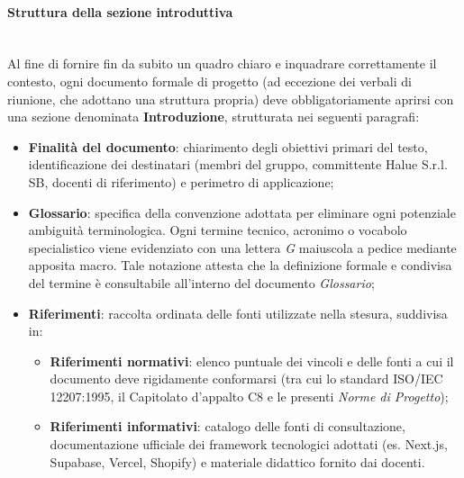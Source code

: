 \paragraph{Struttura della sezione introduttiva}~\\[0.15cm]
Al fine di fornire fin da subito un quadro chiaro e inquadrare correttamente il contesto, ogni documento formale di progetto (ad eccezione dei verbali di riunione, che adottano una struttura propria) deve obbligatoriamente aprirsi con una sezione denominata \textbf{Introduzione}, strutturata nei seguenti paragrafi:
\begin{itemize}
    \item \textbf{Finalità del documento}: chiarimento degli obiettivi primari del testo, identificazione dei destinatari (membri del gruppo, committente Halue S.r.l. SB, docenti di riferimento) e perimetro di applicazione;
    \item \textbf{Glossario}: specifica della convenzione adottata per eliminare ogni potenziale ambiguità terminologica. Ogni termine tecnico, acronimo o vocabolo specialistico viene evidenziato con una lettera \textit{G} maiuscola a pedice mediante apposita macro. Tale notazione attesta che la definizione formale e condivisa del termine è consultabile all'interno del documento \textit{Glossario};
    \item \textbf{Riferimenti}: raccolta ordinata delle fonti utilizzate nella stesura, suddivisa in:
    \begin{itemize}
        \item \textbf{Riferimenti normativi}: elenco puntuale dei vincoli e delle fonti a cui il documento deve rigidamente conformarsi (tra cui lo standard ISO/IEC 12207:1995, il Capitolato d'appalto C8 e le presenti \textit{Norme di Progetto});
        \item \textbf{Riferimenti informativi}: catalogo delle fonti di consultazione, documentazione ufficiale dei framework tecnologici adottati (es. Next.js, Supabase, Vercel, Shopify) e materiale didattico fornito dai docenti.
    \end{itemize}
\end{itemize}

